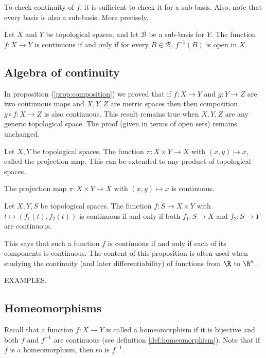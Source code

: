 To check continuity of $f$, it is sufficient to check it for a sub-basis. Also, note that every basis is also a sub-basis. More precisely,
\begin{nlemma}
  Let $X$ and $Y$ be topological spaces, and let $\mathcal{B}$ be a sub-basis for $Y$. The function $f: X \to Y$ is continuous if and only if for every $B \in \mathcal{B}$, $f^{-1}(B)$ is open in $X$.
\end{nlemma}

\subsection{Algebra of continuity}
In proposition (\ref{prop:composition}) we proved that if $f:X \to Y$ and $g:Y \to Z$ are two continuous maps and $X,Y,Z$ are metric spaces then then composition $g \circ f: X \to Z$ is also continuous. This result remains true when $X,Y,Z$ are any generic topological space. The proof (given in terms of open sets) remains unchanged.

\begin{ndfn}
  Let $X,Y$ be topological spaces. The function $\pi: X \times Y \to X$ with $(x, y) \mapsto x$, called the projection map. This can be extended to any product of topological spaces.
\end{ndfn}

\begin{nprop}
  The projection map $\pi: X \times Y \to X$ with $(x, y) \mapsto x$ is continuous.
\end{nprop}

\begin{nprop}
  Let $X,Y,S$ be topological spaces. The function $f: S \to X \times Y$ with $t \mapsto (f_1(t), f_2(t))$ is continuous if and only if both $f_1 : S \to X$ and $f_2 : S \to Y$ are continuous.
\end{nprop}
This says that such a function $f$ is continuous if and only if each of its components is continuous. The content of this proposition is often used when studying the continuity (and later differentiability) of functions from $\R$ to $\R^n$.

EXAMPLES.

\subsection{Homeomorphisms}
Recall that a function $f: X \to Y$ is called a homeomorphism if it is bijective and both $f$ and $f^{-1}$ are continuous (see definition \ref{def:homeomorphism}). Note that if $f$ is a homeomorphism, then so is $f^{-1}$.

